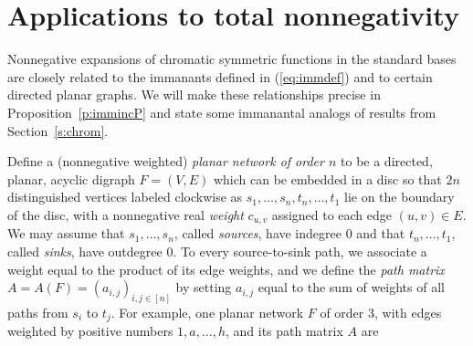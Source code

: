 \documentclass[12pt]{amsart}
\newtheorem{prop}[thm]{Proposition}
\numberwithin{equation}{section}
\newcommand{\imm}[1]{\mathrm{Imm}_{#1}}
\newcommand{\sumsb}[1]{\sum_{\substack{#1}}}  %
\newcommand{\defeq}{:=}
\begin{document}

\section{Applications to total nonnegativity}\label{s:tnn}

Nonnegative expansions of chromatic symmetric functions in
the standard bases
are closely
related to
the immanants defined in (\ref{eq:immdef})
and to certain directed planar graphs.
We will make these relationships precise in Proposition~\ref{p:immincP}
and state some immanantal analogs of results from Section~\ref{s:chrom}.

Define a (nonnegative weighted)
{\em planar network of order $n$} to be a directed, planar, acyclic
digraph $F = (V,E)$
which can be embedded in a disc so that $2n$ distinguished vertices
labeled clockwise as $s_1,\dotsc,s_n,t_n,\dotsc,t_1$
lie on the boundary of the disc,
with a nonnegative real {\em weight} $c_{u,v}$
assigned to each edge $(u,v) \in E$.
We may assume that $s_1,\dotsc,s_n$, called {\em sources}, have indegree $0$
and that $t_n,\dotsc,t_1$, called {\em sinks}, have outdegree $0$.
To every source-to-sink path, we associate a weight equal to the product
of its edge weights,
and we define the {\em path matrix}
$A = A(F) = (a_{i,j})_{i,j \in [n]}$ by
setting $a_{i,j}$ equal to the sum of weights of all paths
from $s_i$ to $t_j$.
For example, one
planar network $F$ of order $3$, with edges weighted by positive numbers
$1, a, \dotsc, h$,
and its path matrix $A$ are
\end{document}
